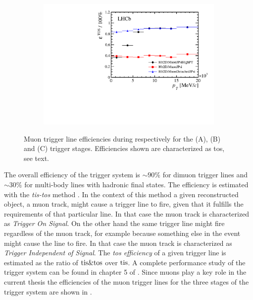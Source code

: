 \begin{figure}[t!]
\begin{subfigure}{0.5\textwidth}
    \includegraphics[width=\textwidth,trim=0.45cm 0cm 0.4cm 0cm, clip=true]{Figures/Chapter2/hlt2_muon_eff}
    \caption{}
    \label{det_run_one_hlt2_muon_line_eff}
  \end{subfigure}
  \caption{Muon trigger line efficiencies during \runone respectively for the \lzero (A), \hltone (B) and \hlttwo (C) trigger stages.
           Efficiencies shown are characterized as tos, see text.}
  \label{det_run_one_muon_line_eff}
\end{figure}

The overall efficiency of the \lhcb trigger system is $\sim 90\%$ for dimuon trigger lines and $\sim 30\%$
for multi-body lines with hadronic final states. The efficiency is estimated with the {\it tis-tos}
method \cite{LHCb-2008-073}. In the context of this method a given reconstructed object,
\ie a muon track, might cause a trigger line to fire, given that it fulfills the requirements of that particular line.
In that case the muon track is characterized as {\it Trigger On Signal}. On the other hand the same trigger line might
fire regardless of the muon track, for example because something else in the event might cause the line
to fire. In that case the muon track is characterized as {\it Trigger Independent of Signal}.
The {\it tos efficiency} of a given trigger line is estimated as the ratio of ${\rm tis}\&{\rm tos}$
over ${\rm tis}$. A complete performance study of the trigger system can be found in chapter 5
of \cite{Aaij:2014jba}. Since muons play a key role in the current thesis the efficiencies of the muon
trigger lines for the three stages of the \lhcb trigger system are  shown in .

